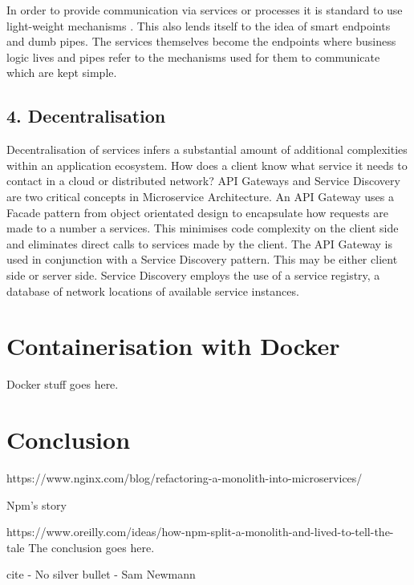 \documentclass[journal]{IEEEtran}
\begin{document}
In order to provide communication via services or processes it is standard to use light-weight mechanisms \cite{MicroservicesYesterdayTodayTomorrow}. This also lends itself to the idea of smart endpoints and dumb pipes\cite{MicroservicesResourceGuide}. The services themselves become the endpoints where business logic lives and pipes refer to the mechanisms used for them to communicate which are kept simple.

\subsection*{ 4. Decentralisation }
Decentralisation of services infers a substantial amount of additional complexities within an application ecosystem. How does a client know what service it needs to contact in a cloud or distributed network? API Gateways\cite{APIGateways} and Service Discovery\cite{ServiceDiscovery} are two critical concepts in Microservice Architecture. An API Gateway uses a Facade pattern\cite{Gamma:1995:DPE:186897} from object orientated design to encapsulate how requests are made to a number a services. This minimises code complexity on the client side and eliminates direct calls to services made by the client. The API Gateway is used in conjunction with a Service Discovery pattern. This may be either client side or server side. Service Discovery employs the use of a service registry, a database of network locations of available service instances\cite{ServiceDiscovery}.


\section{Containerisation with Docker}

Docker stuff goes here.

\section{Conclusion}


https://www.nginx.com/blog/refactoring-a-monolith-into-microservices/

Npm’s story

https://www.oreilly.com/ideas/how-npm-split-a-monolith-and-lived-to-tell-the-tale
The conclusion goes here.

cite - No silver bullet - Sam Newmann

\printbibliography

\end{document}
